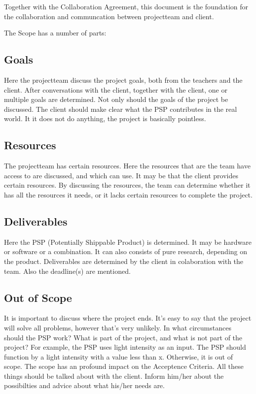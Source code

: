 \documentclass[10pt]{report}
\begin{document}
Together with the Collaboration Agreement, this document is the foundation for the collaboration and communcation between projectteam and client.

\bigskip

The Scope has a number of parts:

\subsection{Goals}

Here the projectteam discuss the project goals, both from the teachers and the client. After conversations with the client, together with the client, one or multiple goals are determined. Not only should the goals of the project be discussed. The client should make clear what the PSP contributes in the real world. It it does not do anything, the project is basically pointless.

\subsection{Resources}

The projectteam has certain resources. Here the resources that are the team have access to are discussed, and which  can use. It may be that the client provides certain resources. By discussing the resources, the team can determine whether it has all the resources it needs, or it lacks certain resources to complete the project.

\subsection{Deliverables}

Here the PSP (Potentially Shippable Product) is determined. It may be hardware or software or a combination. It can also consists of pure research, depending on the product. Deliverables are determined by the client in colaboration with the team. Also the deadline(s) are mentioned.

\subsection{Out of Scope}

It is important to discuss where the project ends. It's easy to say that the project will solve all problems, however that's very unlikely. In what circumstances should the PSP work? What is part of the project, and what is not part of the project? For example, the PSP uses light intensity as an input. The PSP should function by a light intensity with a value less than x. Otherwise, it is out of scope. The scope has an profound impact on the Acceptence Criteria. All these things should be talked about with the client. Inform him/her about the possibilties and advice about what his/her needs are.
\end{document}
